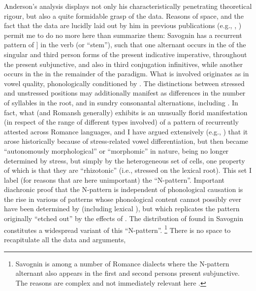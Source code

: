 \documentclass[output=paper,
modfonts
]{LSP/langsci}
\begin{document}
Anderson's analysis displays not only his characteristically penetrating
theoretical rigour, but also a quite formidable grasp of the data.
Reasons of space, and the fact that the data are lucidly laid out by him
in previous publications (e.g., \citealt{anderson2008a}, \citeyear{anderson2011a}) permit me to do no
more here than summarize them: Savognin has a recurrent pattern of
] in the verb  (or ``stem''), such that one
alternant occurs in the  of the singular and third person forms of
the present indicative imperative, throughout the present subjunctive,
and also in third conjugation infinitives, while another occurs in the
 in the remainder of the paradigm. What is involved originates as
 in vowel quality, phonologically conditioned by . The
distinctions between stressed and unstressed positions may additionally
manifest as differences in the number of syllables in the root, and in
sundry consonantal alternations, including . In fact, what
 (and Romansh generally) exhibits is an unusually florid
manifestation (in respect of the range of different  types
involved) of a pattern of  recurrently attested across
Romance languages, and I have argued extensively (e.g., \citealt{maiden2005,maiden2011c}) that it arose historically because of stress-related vowel
differentiation, but then became ``autonomously morphological'' or
``morphomic'' in nature, being no longer determined by stress, but simply
by the heterogeneous set of  cells, one property of which is
that they are ``rhizotonic'' (i.e., stressed on the lexical root). This
set I label (for reasons that are here unimportant) the ``N-pattern''.
Important diachronic proof that the N-pattern is independent of
phonological causation is the rise in various  of
 patterns whose phonological content cannot possibly ever
have been determined by  (including lexical ), but which
replicates the pattern originally ``etched out'' by the effects of .
The distribution of  found in Savognin constitutes a
widespread variant of this ``N-pattern''. \footnote{Savognin is among a
  number of Romance dialects where the N-pattern alternant also appears
  in the first and second persons  present subjunctive. The
  reasons are complex and not immediately relevant here \citep[cf.][]{maiden2012}.} There is no space to recapitulate all the data and arguments,
\end{document}
